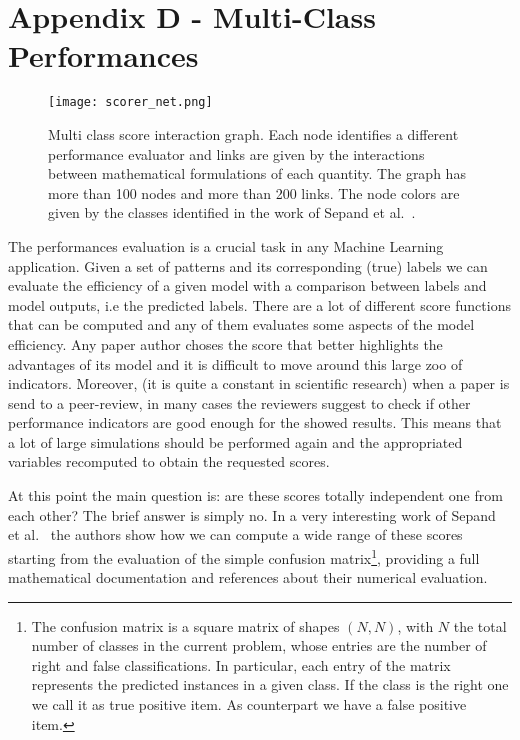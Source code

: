 \documentclass{standalone}
\begin{document}
\chapter*{Appendix D - Multi-Class Performances}

\begin{center}
\begin{figure}[htbp]
\centering
\texttt{[image: scorer\_net.png]}
\caption{Multi class score interaction graph.
Each node identifies a different performance evaluator and links are given by the interactions between mathematical formulations of each quantity.
The graph has more than 100 nodes and more than 200 links.
The node colors are given by the classes identified in the work of Sepand et al.~\cite{PyCM}.
}
\label{fig:scorer_net}
\end{figure}
\end{center}

The performances evaluation is a crucial task in any Machine Learning application.
Given a set of patterns and its corresponding (true) labels we can evaluate the efficiency of a given model with a comparison between labels and model outputs, i.e the predicted labels.
There are a lot of different score functions that can be computed and any of them evaluates some aspects of the model efficiency.
Any paper author choses the score that better highlights the advantages of its model and it is difficult to move around this large zoo of indicators.
Moreover, (it is quite a constant in scientific research) when a paper is send to a peer-review, in many cases the reviewers suggest to check if other performance indicators are good enough for the showed results.
This means that a lot of large simulations should be performed again and the appropriated variables recomputed to obtain the requested scores.

At this point the main question is: are these scores totally independent one from each other?
The brief answer is simply no.
In a very interesting work of Sepand et al.~\cite{PyCM} the authors show how we can compute a wide range of these scores starting from the evaluation of the simple confusion matrix\footnote{
  The confusion matrix is a square matrix of shapes $(N, N)$, with $N$ the total number of classes in the current problem, whose entries are the number of right and false classifications.
  In particular, each entry of the matrix represents the predicted instances in a given class.
  If the class is the right one we call it as true positive item.
  As counterpart we have a false positive item.
}, providing a full mathematical documentation and references about their numerical evaluation.
\end{document}
